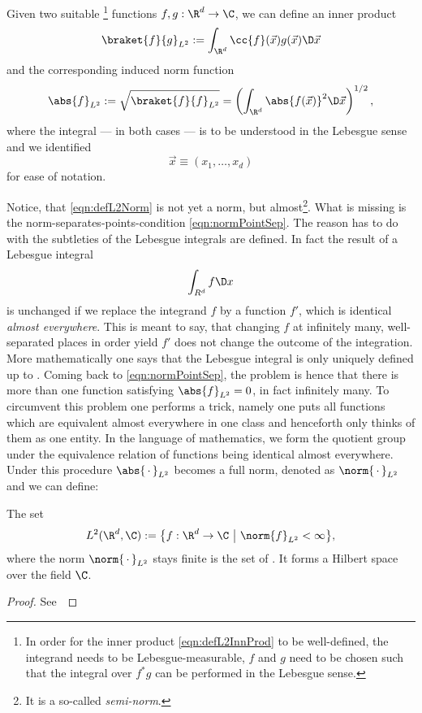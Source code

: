\begin{defn}
	\label{def:L2Norm}
	Given two suitable%
	\footnote{%
		In order for the inner product \eqref{eqn:defL2InnProd}
		to be well-defined, the integrand needs to be Lebesgue-measurable,
		\ie $f$ and $g$ need to be chosen such that the integral
		over $f^\ast g$ can be performed in the Lebesgue sense.%
	}
	functions $f, g : \R^d \to \C$,
	we can define an inner product
	\begin{equation}
		\braket{f}{g}_{L^2} := \int_{\R^d} \cc{f}(\vec{x}) g(\vec{x}) \D \vec{x}
		\label{eqn:defL2InnProd}
	\end{equation}
	and the corresponding induced norm function
	\begin{equation}
		\abs{f}_{L^2} := \sqrt{\braket{f}{f}_{L^2}} = \left( \int_{\R^d} \abs{f(\vec{x})}^2 \D \vec{x} \right)^{1/2},
		\label{eqn:defL2Norm}
	\end{equation}
	where the integral --- in both cases --- is to be understood in the Lebesgue sense
	and we identified
	\[ \vec{x} \equiv (x_1, \ldots, x_d) \]
	for ease of notation.
\end{defn}
Notice, that \eqref{eqn:defL2Norm} is not yet a norm,
but almost\footnote{It is a so-called \textit{semi-norm}.}.
What is missing is the norm-separates-points-condition \eqref{eqn:normPointSep}.
The reason has to do with the subtleties
of the Lebesgue integrals are defined.
In fact the result of a Lebesgue integral
\[ \int_{R^d} f \D x \]
is unchanged if we replace the integrand $f$ by a function $f'$,
which is identical \emph{almost everywhere}.
This is meant to say,
that changing $f$ at infinitely many, well-separated places in order yield $f'$
does not change the outcome of the integration.
More mathematically one says that the Lebesgue integral is only uniquely defined
up to .
Coming back to \eqref{eqn:normPointSep},
the problem is hence that there is more than one function satisfying
$\abs{f}_{L^2} = 0$,
in fact infinitely many.
To circumvent this problem one performs a trick,
namely one puts all functions which are equivalent almost everywhere
in one class and henceforth only thinks of them as one entity.
In the language of mathematics,
we form the quotient group under the equivalence relation of functions being identical
almost everywhere.
Under this procedure $\abs{\slot}_{L^2}$ becomes a full norm,
denoted as $\norm{\slot}_{L^2}$ and we can define:
\begin{prop}
	\label{prop:L2HilbertSpace}
	The set
	\[ L^2(\R^d, \C) := \big\{ f : \R^d \to \C ~\big|~ \norm{f}_{L^2} < \infty \big\}, \]
	where the norm $\norm{\slot}_{L^2}$ stays finite
	is the set of .
	It forms a Hilbert space over the field $\C$.
	\begin{proof}
		See~\cite{Adams2003}
	\end{proof}
\end{prop}
